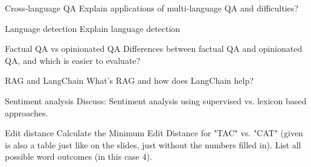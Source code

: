 \documentclass{article}
\begin{document}
\begin{exercise}{Cross-language QA}
  Explain applications of multi-language QA and difficulties?

  \begin{solution}
  \end{solution}
\end{exercise}

\begin{exercise}{Language detection}
  Explain language detection

  \begin{solution}
  \end{solution}
\end{exercise}

\begin{exercise}{Factual QA vs opinionated QA}
  Differences between factual QA and opinionated QA, and which is easier to evaluate?

  \begin{solution}
  \end{solution}
\end{exercise}

\begin{exercise}{RAG and LangChain}
  What's RAG and how does LangChain help?

  \begin{solution}
  \end{solution}
\end{exercise}

\begin{exercise}{Sentiment analysis}
  Discuss: Sentiment analysis using supervised vs. lexicon based approaches.

  \begin{solution}
  \end{solution}
\end{exercise}

\begin{exercise}{Edit distance}
  Calculate the Minimum Edit Distance for "TAC" vs. "CAT" (given is also a table just like on the slides, just without the numbers filled in). List all possible word outcomes (in this case 4).

  \begin{solution}
  \end{solution}
\end{exercise}


\setcounter{section}{2021}
\end{document}
